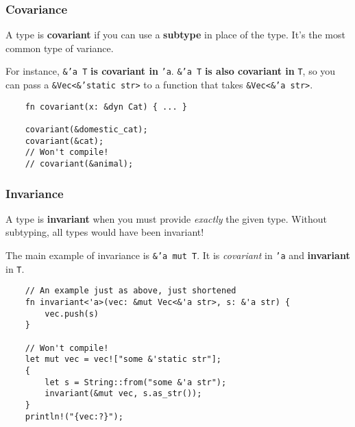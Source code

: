 \documentclass[aspectratio=1610,t]{beamer}
\begin{document}

\begin{frame}[fragile]
\frametitle{Covariance}
A type is \textbf{covariant} if you can use a \textbf{subtype} in place of the type. It's the most common type of variance.

For instance, \texttt{\&'a T} \textbf{is covariant in} \texttt{'a}. \texttt{\&'a T} \textbf{is also covariant in} \texttt{T}, so you can pass a \texttt{\&Vec<\&'static str>} to a function that takes \texttt{\&Vec<\&'a str>}.

\begin{verbatim}
    fn covariant(x: &dyn Cat) { ... }

    covariant(&domestic_cat);
    covariant(&cat);
    // Won't compile!
    // covariant(&animal);
\end{verbatim}
\end{frame}


\begin{frame}[fragile,c]
\frametitle{Invariance}
A type is \textbf{invariant} when you must provide \textit{exactly} the given type. Without subtyping, all types would have been invariant!

The main example of invariance is \texttt{\&'a mut T}. It is \textit{covariant} in \texttt{'a} and \textbf{invariant} in \texttt{T}.

\begin{verbatim}
    // An example just as above, just shortened
    fn invariant<'a>(vec: &mut Vec<&'a str>, s: &'a str) {
        vec.push(s)
    }

    // Won't compile!
    let mut vec = vec!["some &'static str"];
    {
        let s = String::from("some &'a str");
        invariant(&mut vec, s.as_str());
    }
    println!("{vec:?}");
\end{verbatim}
\end{frame}

\end{document}
